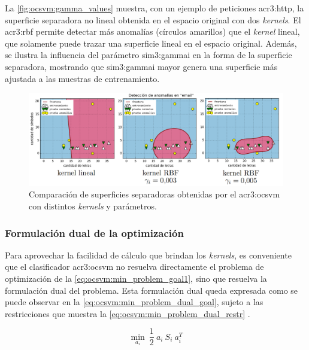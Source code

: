 La \autoref{fig:ocsvm:gamma_values} muestra, con un ejemplo de peticiones
\gls{acr3:http}, la superficie separadora no lineal obtenida en el
espacio original con dos \textit{kernels}. El \gls{acr3:rbf} permite
detectar más anomalías (círculos amarillos) que el \textit{kernel} lineal,
que solamente puede trazar una superficie lineal en el espacio original.
Además, se ilustra la influencia del parámetro \gls{sim3:gammai} en la
forma de la superficie separadora, mostrando que \gls{sim3:gammai} mayor
genera una superficie más ajustada a las muestras de entrenamiento.

\begin{figure}[ht]
    \centering
    \includegraphics[width=\linewidth]{images/ocsvm-rbf-gamma.png}

    \caption{Comparación de superficies separadoras obtenidas por el
        \gls{acr3:ocsvm} con distintos \textit{kernels} y parámetros.}
    \label{fig:ocsvm:gamma_values}
\end{figure}


\subsubsection{Formulación dual de la optimización}

Para aprovechar la facilidad de cálculo que brindan los \textit{kernels},
es conveniente que el clasificador \gls{acr3:ocsvm} no resuelva directamente
el problema de optimización de la \autoref{eq:ocsvm:min_problem_goal1},
sino que resuelva la formulación dual del problema.
Esta formulación dual queda expresada como se puede observar en la
\autoref{eq:ocsvm:min_problem_dual_goal}, sujeto a las restricciones
que muestra la \autoref{eq:ocsvm:min_problem_dual_restr}
\citep{aggarwal2013outlier}. %

\begin{equation}
    \label{eq:ocsvm:min_problem_dual_goal}
    \min_{a_{i}}
    \
    \frac{1}{2} \ a_{i} \ S_{i} \ a_{i}^{T}
\end{equation}

